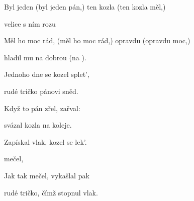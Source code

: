 

\zs
Byl jeden  (byl jeden pán,) ten kozla  (ten kozla měl,)

velice  s ním rozu

Měl ho moc rád, (měl ho moc rád,) opravdu  (opravdu moc,)

hladil mu  na dobrou  (na  ).
\ks

\zs
Jednoho dne se kozel splet',

rudé tričko pánovi sněd.

Když to pán zřel, zařval: 

svázal kozla na koleje.
\ks

\zs
Zapískal vlak, kozel se lek'.

 mečel, 

Jak tak mečel, vykašlal pak

rudé tričko, čímž stopnul vlak.
\ks

\kp
